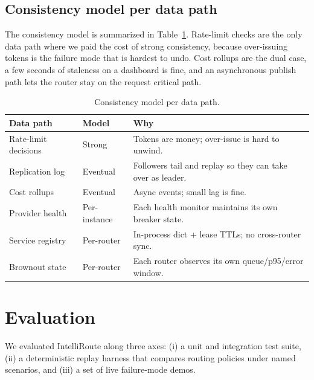 \documentclass[conference,letterpaper]{IEEEtran}
\begin{document}
\subsection{Consistency model per data path}
The consistency model is summarized in Table~\ref{tab:consistency}.
Rate-limit checks are the only data path where we paid the cost of
strong consistency, because over-issuing tokens is the failure mode
that is hardest to undo. Cost rollups are the dual case, a few
seconds of staleness on a dashboard is fine, and an asynchronous
publish path lets the router stay on the request critical path.

\begin{table}[!t]
\caption{Consistency model per data path.}
\label{tab:consistency}
\centering
\renewcommand{\arraystretch}{1.15}
\setlength{\tabcolsep}{3pt}
\begin{tabularx}{\columnwidth}{@{}l l X@{}}
\toprule
Data path        & Model    & Why \\
\midrule
Rate-limit decisions & Strong    & Tokens are money; over-issue is
                                   hard to unwind. \\
Replication log      & Eventual  & Followers tail and replay so they
                                   can take over as leader. \\
Cost rollups         & Eventual  & Async events; small lag is fine. \\
Provider health      & Per-instance &
   Each health monitor maintains its own breaker state. \\
Service registry     & Per-router & In-process dict + lease TTLs;
                                   no cross-router sync. \\
Brownout state       & Per-router & Each router observes its own
                                   queue/p95/error window. \\
\bottomrule
\end{tabularx}
\end{table}

\section{Evaluation}\label{sec:eval}
We evaluated IntelliRoute along three axes: (i) a unit and integration
test suite, (ii) a deterministic replay harness that compares routing
policies under named scenarios, and (iii) a set of live failure-mode
demos.
\end{document}
